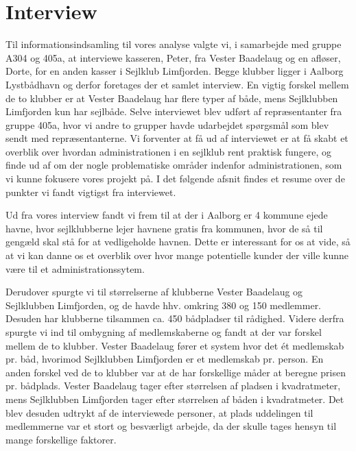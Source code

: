 \chapter{Interview}
\label{chap:Interview}
Til informationsindsamling til vores analyse valgte vi, i samarbejde med gruppe A304 og 405a, at interviewe kasseren, Peter, fra Vester Baadelaug og en afløser, Dorte, for en anden kasser i Sejlklub Limfjorden. Begge klubber ligger i Aalborg Lystbådhavn og derfor foretages der et samlet interview. En vigtig forskel mellem de to klubber er at Vester Baadelaug har flere typer af både, mens Sejlklubben Limfjorden kun har sejlbåde. Selve interviewet blev udført af repræsentanter fra gruppe 405a, hvor vi andre to grupper havde udarbejdet spørgsmål som blev sendt med repræsentanterne. Vi forventer at få ud af interviewet er at få skabt et overblik over hvordan administrationen i en sejlklub rent praktisk fungere, og finde ud af om der nogle problematiske områder indenfor administrationen, som vi kunne fokusere vores projekt på. I det følgende afsnit findes et resume over de punkter vi fandt vigtigst fra interviewet.

Ud fra vores interview fandt vi frem til at der i Aalborg er 4 kommune ejede havne, hvor sejlklubberne lejer havnene gratis fra kommunen, hvor de så til gengæld skal stå for at vedligeholde havnen. Dette er interessant for os at vide, så at vi kan danne os et overblik over hvor mange potentielle kunder der ville kunne være til et administrationssytem. 

Derudover spurgte vi til størrelserne af klubberne Vester Baadelaug og Sejlklubben Limfjorden, og de havde hhv. omkring 380 og 150 medlemmer. Desuden har klubberne tilsammen ca. 450 bådpladser til rådighed. Videre derfra spurgte vi ind til ombygning af medlemskaberne og fandt at der var forskel mellem de to klubber. Vester Baadelaug fører et system hvor det ét medlemskab pr. båd, hvorimod Sejlklubben Limfjorden er et medlemskab pr. person. En anden forskel ved de to klubber var at de har forskellige måder at beregne prisen pr. bådplads. Vester Baadelaug tager efter størrelsen af pladsen i kvadratmeter, mens Sejlklubben Limfjorden tager efter størrelsen af båden i kvadratmeter. Det blev desuden udtrykt af de interviewede personer, at plads uddelingen til medlemmerne var et stort og besværligt arbejde, da der skulle tages hensyn til mange forskellige faktorer.

